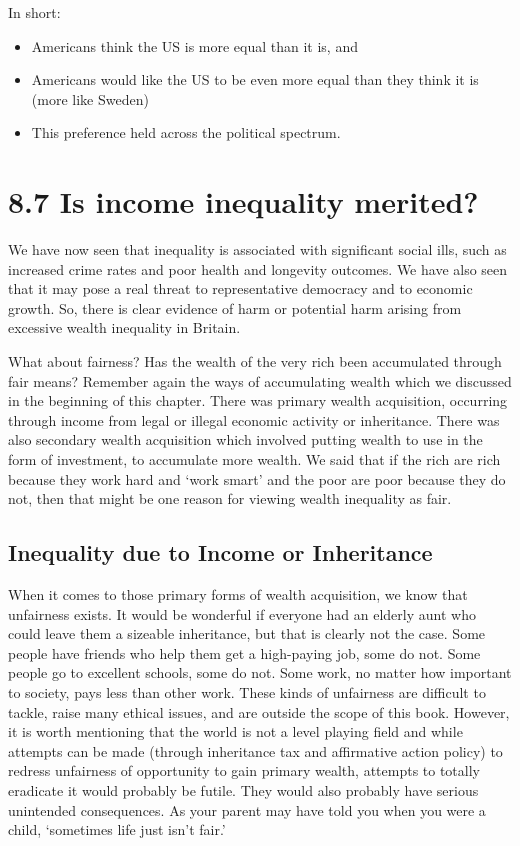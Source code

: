 \documentclass[]{tufte-handout}
\providecommand{\tightlist}{%
  \setlength{\itemsep}{0pt}\setlength{\parskip}{0pt}}
\begin{document}
In short:

\begin{itemize}
\tightlist
\item
  Americans think the US is more equal than it is, and
\item
  Americans would like the US to be even more equal than they think it
  is (more like Sweden)
\item
  This preference held across the political spectrum.
\end{itemize}

\hypertarget{is-income-inequality-merited}{%
\section{8.7 Is income inequality
merited?}\label{is-income-inequality-merited}}

We have now seen that inequality is associated with significant social
ills, such as increased crime rates and poor health and longevity
outcomes. We have also seen that it may pose a real threat to
representative democracy and to economic growth. So, there is clear
evidence of harm or potential harm arising from excessive wealth
inequality in Britain.

What about fairness? Has the wealth of the very rich been accumulated
through fair means? Remember again the ways of accumulating wealth which
we discussed in the beginning of this chapter. There was primary wealth
acquisition, occurring through income from legal or illegal economic
activity or inheritance. There was also secondary wealth acquisition
which involved putting wealth to use in the form of investment, to
accumulate more wealth. We said that if the rich are rich because they
work hard and `work smart' and the poor are poor because they do not,
then that might be one reason for viewing wealth inequality as fair.

\hypertarget{inequality-due-to-income-or-inheritance}{%
\subsection{Inequality due to Income or
Inheritance}\label{inequality-due-to-income-or-inheritance}}

When it comes to those primary forms of wealth acquisition, we know that
unfairness exists. It would be wonderful if everyone had an elderly aunt
who could leave them a sizeable inheritance, but that is clearly not the
case. Some people have friends who help them get a high-paying job, some
do not. Some people go to excellent schools, some do not. Some work, no
matter how important to society, pays less than other work. These kinds
of unfairness are difficult to tackle, raise many ethical issues, and
are outside the scope of this book. However, it is worth mentioning that
the world is not a level playing field and while attempts can be made
(through inheritance tax and affirmative action policy) to redress
unfairness of opportunity to gain primary wealth, attempts to totally
eradicate it would probably be futile. They would also probably have
serious unintended consequences. As your parent may have told you when
you were a child, `sometimes life just isn't fair.'
\end{document}
